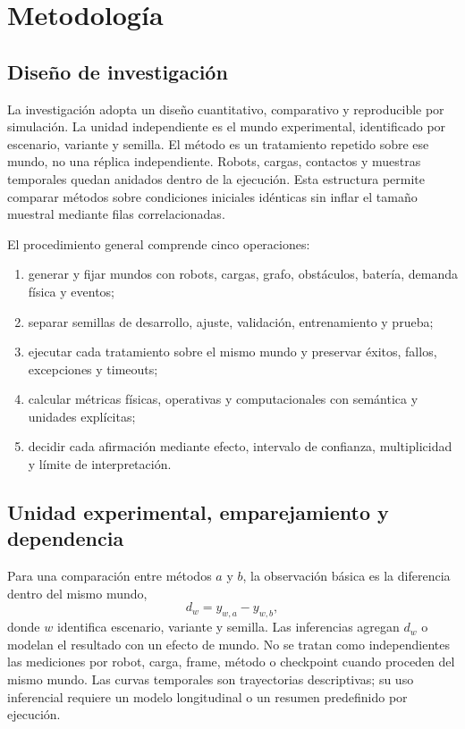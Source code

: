 \section{Metodología}

\subsection{Diseño de investigación}

La investigación adopta un diseño cuantitativo, comparativo y reproducible por simulación. La unidad independiente es el mundo experimental, identificado por escenario, variante y semilla. El método es un tratamiento repetido sobre ese mundo, no una réplica independiente. Robots, cargas, contactos y muestras temporales quedan anidados dentro de la ejecución. Esta estructura permite comparar métodos sobre condiciones iniciales idénticas sin inflar el tamaño muestral mediante filas correlacionadas.



El procedimiento general comprende cinco operaciones:
\begin{enumerate}[leftmargin=2em]
  \item generar y fijar mundos con robots, cargas, grafo, obstáculos, batería, demanda física y eventos;
  \item separar semillas de desarrollo, ajuste, validación, entrenamiento y prueba;
  \item ejecutar cada tratamiento sobre el mismo mundo y preservar éxitos, fallos, excepciones y timeouts;
  \item calcular métricas físicas, operativas y computacionales con semántica y unidades explícitas;
  \item decidir cada afirmación mediante efecto, intervalo de confianza, multiplicidad y límite de interpretación.
\end{enumerate}

\subsection{Unidad experimental, emparejamiento y dependencia}

Para una comparación entre métodos $a$ y $b$, la observación básica es la diferencia dentro del mismo mundo,
\[
  d_w = y_{w,a}-y_{w,b},
\]
donde $w$ identifica escenario, variante y semilla. Las inferencias agregan $d_w$ o modelan el resultado con un efecto de mundo. No se tratan como independientes las mediciones por robot, carga, frame, método o checkpoint cuando proceden del mismo mundo. Las curvas temporales son trayectorias descriptivas; su uso inferencial requiere un modelo longitudinal o un resumen predefinido por ejecución.

